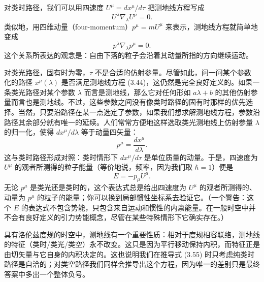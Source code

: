 对类时路径，我们可以用四速度 $U^\mu = dx^\mu/d\tau$ 把测地线方程写成
\begin{equation*}
U^\lambda\nabla_\lambda U^\mu = 0.
\tag{3.60}
\end{equation*}
类似地，用四维动量（four-momentum）$p^\mu = mU^\mu$ 来表示，测地线方程就简单地变成
\begin{equation*}
p^\lambda\nabla_\lambda p^\mu = 0.
\tag{3.61}
\end{equation*}
这个关系所表达的观念是：自由下落的粒子会沿着其动量所指的方向继续运动。

对类光路径，固有时为零，$\tau$ 不是合适的仿射参量。尽管如此，问一问某个参数
化的路径 $x^\mu(\lambda)$ 是否满足测地线方程 (3.44)，这仍然是完全良好定义的。如果一条类光路径对某个参数 $\lambda$ 而言是测地线，那么它对任何形如 $a\lambda + b$ 的其他仿射参量而言也是测地线。不过，这些参数之间没有像类时路径的固有时那样的优先选择。当然，只要沿路径在某一点选定了参数，如果我们想求解测地线方程，参数沿路径其余部分就有唯一的延续。人们常常方便地这样选取类光测地线上仿射参量 $\lambda$ 的归一化，使得 $dx^\mu/d\lambda$ 等于动量四矢量：
\begin{equation*}
p^\mu = \frac{dx^\mu}{d\lambda}.
\tag{3.62}
\end{equation*}
这与类时路径形成对照：类时情形下 $dx^\mu/d\tau$ 是单位质量的动量。于是，四速度为 $U^\mu$ 的观者所测得的粒子能量（等价地说，频率，因为我们取 $\hbar = 1$）便是
\begin{equation*}
E = -p_\mu U^\mu.
\tag{3.63}
\end{equation*}
无论 $p^\mu$ 是类光还是类时的，这个表达式总是给出四速度为 $U^\mu$ 的观者所测得的、动量为 $p^\mu$ 的粒子的能量；你可以换到局部惯性坐标系去验证它。（一个警告：这个 $E$ 的表达式不包含势能，只包含来自运动和惯性的内禀能量。在一般时空中并不会有良好定义的引力势能概念，尽管在某些特殊情形下它确实存在。）

具有洛伦兹度规的时空中，测地线有一个重要性质：相对于度规相容联络，测地线的特征（类时/类光/类空）永不改变。这只是因为平行移动保持内积，而特征正是由切矢量与它自身的内积决定的。这也说明我们在推导式 (3.55) 时只考虑纯类时路径是自洽的；对类空路径我们同样会推导出这个方程，因为唯一的差别只是最终答案中多出一个整体负号。

